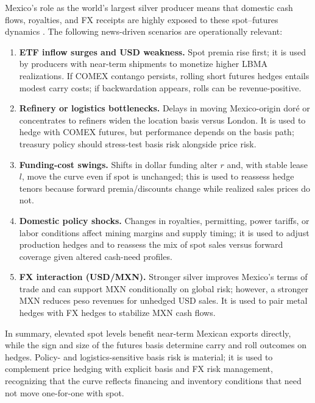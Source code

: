 \documentclass[10pt,a4paper]{article} %
\begin{document}
Mexico’s role as the world’s largest silver producer means that domestic cash flows, royalties, and FX receipts are highly exposed to these spot–futures dynamics \citep{reuters_mx_top_silver}. The following news-driven scenarios are operationally relevant:
\begin{enumerate}
  \item \textbf{ETF inflow surges and USD weakness.} Spot premia rise first; it is used by producers with near-term shipments to monetize higher LBMA realizations. If COMEX contango persists, rolling short futures hedges entails modest carry costs; if backwardation appears, rolls can be revenue-positive.
  \item \textbf{Refinery or logistics bottlenecks.} Delays in moving Mexico-origin doré or concentrates to refiners widen the location basis versus London. It is used to hedge with COMEX futures, but performance depends on the basis path; treasury policy should stress-test basis risk alongside price risk.
  \item \textbf{Funding-cost swings.} Shifts in dollar funding alter \(r\) and, with stable lease \(l\), move the curve even if spot is unchanged; this is used to reassess hedge tenors because forward premia/discounts change while realized sales prices do not.
  \item \textbf{Domestic policy shocks.} Changes in royalties, permitting, power tariffs, or labor conditions affect mining margins and supply timing; it is used to adjust production hedges and to reassess the mix of spot sales versus forward coverage given altered cash-need profiles.
  \item \textbf{FX interaction (USD/MXN).} Stronger silver improves Mexico’s terms of trade and can support MXN conditionally on global risk; however, a stronger MXN reduces peso revenues for unhedged USD sales. It is used to pair metal hedges with FX hedges to stabilize MXN cash flows.
\end{enumerate}
In summary, elevated spot levels benefit near-term Mexican exports directly, while the sign and size of the futures basis determine carry and roll outcomes on hedges. Policy- and logistics-sensitive basis risk is material; it is used to complement price hedging with explicit basis and FX risk management, recognizing that the curve reflects financing and inventory conditions that need not move one-for-one with spot.
\end{document}
